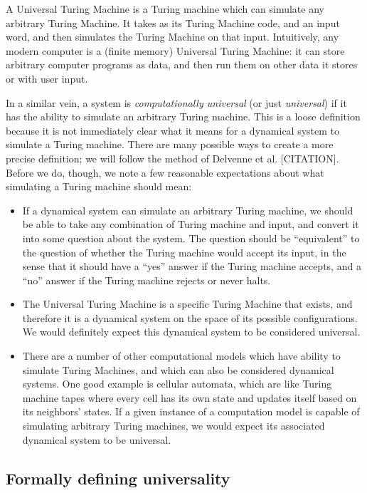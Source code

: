 \documentclass{fkpaper}
\begin{document}
\begin{multicols}{2}
A Universal Turing Machine is a Turing machine which can simulate any
arbitrary Turing Machine. It takes as its Turing Machine code, and an
input word, and then simulates the Turing Machine on that input.
Intuitively, any modern computer is a (finite memory) Universal Turing
Machine: it can store arbitrary computer programs as data, and then
run them on other data it stores or with user input.

In a similar vein, a system is {\it computationally universal} (or
just {\it universal}) if it has the ability to simulate an arbitrary
Turing machine. This is a loose definition because it is not
immediately clear what it means for a dynamical system to simulate a
Turing machine. There are many possible ways to create a more precise
definition; we will follow the method of Delvenne et al. [CITATION].
Before we do, though, we note a few reasonable expectations about what
simulating a Turing machine should mean:

\begin{itemize}
  \item If a dynamical system can simulate an arbitrary Turing machine, we should be able to take any combination of Turing machine and input, and convert it into some question about the system. The question should be ``equivalent'' to the question of whether the Turing machine would accept its input, in the sense that it should have a ``yes'' answer if the Turing machine accepts, and a ``no'' answer if the Turing machine rejects or never halts.

  \item The Universal Turing Machine is a specific Turing Machine that exists, and therefore it is a dynamical system on the space of its possible configurations. We would definitely expect this dynamical system to be considered universal.

  \item There are a number of other computational models which have ability to simulate Turing Machines, and which can also be considered dynamical systems. One good example is cellular automata, which are like Turing machine tapes where every cell has its own state and updates itself based on its neighbors' states. If a given instance of a computation model is capable of simulating arbitrary Turing machines, we would expect its associated dynamical system to be universal.

\end{itemize}

\subsection*{Formally defining universality}


\end{multicols}
\end{document}
